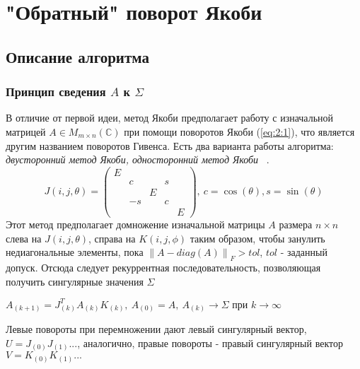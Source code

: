 \section{"Обратный" поворот Якоби}

\subsection{Описание алгоритма}

\subsubsection{Принцип сведения $A$ к $\Sigma$}
В отличие от первой идеи, метод Якоби предполагает работу с изначальной матрицей $A\in M_{m\times n}(\mathbb{C})$ при помощи поворотов Якоби (\ref{eq:2:1}), что является другим названием поворотов Гивенса. Есть два варианта работы алгоритма:\textit{ двусторонний метод Якоби, односторонний метод Якоби} ~\cite{Dongarra2018}.
\begin{equation} \label{eq:2:1}
    J(i,j,\theta) = 
    \begin{pmatrix}E&&&&\\
        &c&&s\\
        &&E&&\\
        &-s&&c\\
        &&&&E
    \end{pmatrix},\
    c = \cos(\theta), s =\sin(\theta) 
\end{equation}
Этот метод предполагает домножение изначальной матрицы $A$ размера $n\times n \ $ слева на $J(i,j,\theta)$, справа на $K(i,j,\phi)$ таким образом, чтобы занулить недиагональные элементы, пока $\left\| A - diag(A) \right\|_F > tol$, $tol$ - заданный допуск. 
Отсюда следует рекуррентная последовательность, позволяющая получить сингулярные значения $\Sigma$
\begin{center}
    $A_{(k+1)} = J^T_{(k)}A_{(k)}K_{(k)}, \ A_{(0)}= A, \ A_{(k)}\longrightarrow\Sigma \text{ при } k\to\infty$
\end{center}

Левые повороты при перемножении дают левый сингулярный вектор, $U=J_{(0)}J_{(1)}...$, аналогично, правые повороты - правый сингулярный вектор $V=K_{(0)}K_{(1)}...$

